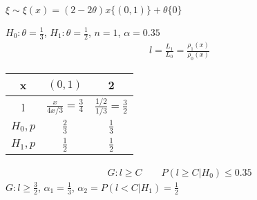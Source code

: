 \documentclass{article}
\begin{document}
\begin{eg}
  $\xi \sim \xi(x)=(2-2\theta){x}\{(0,1)\}+\theta\{0\}$

  $H_0:\theta=\frac{1}{3}$, $H_1:\theta=\frac{1}{2}$, $n=1$, $\alpha=0.35$
  \begin{gather*}
    l=\frac{L_1}{L_0}=\frac{\rho_1(x)}{\rho_0(x)}
  \end{gather*}
  \begin{center}
    \begin{tabular}{| c | c | c |}
      \hline
      x & $(0,1)$ & 2 \\
      \hline 
      l & $\frac{x}{4x/3}=\frac{3}{4}$ & $\frac{1/2}{1/3}=\frac{3}{2}$\\ 
      \hline 
      $H_0, p$ & $\frac{2}{3}$ & $\frac{1}{3}$ \\ 
      \hline
      $H_1, p$ & $\frac{1}{2}$ & $\frac{1}{2}$ \\
      \hline
    \end{tabular}
  \end{center}
  \begin{gather*}
    G:l \ge C \qquad P(l \ge C | H_0) \le 0.35
  \end{gather*}
  $G: l\ge \frac{3}{2}$, $\alpha_1=\frac{1}{3}$, $\alpha_2=P(l < C|H_1)=\frac{1}{2}$
\end{eg}
\end{document}
